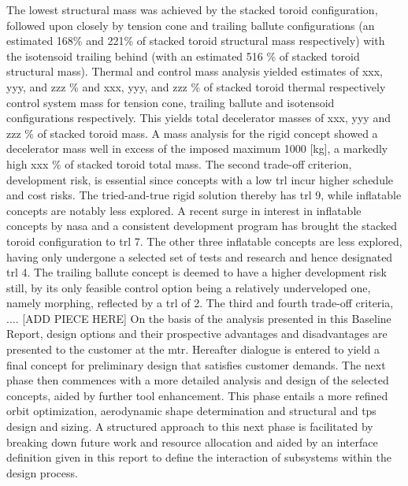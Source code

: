 The lowest structural mass was achieved by the stacked toroid configuration, followed upon closely by tension cone and trailing ballute configurations (an estimated 168\% and 221\% of stacked toroid structural mass respectively) with the isotensoid trailing behind (with an estimated 516 \% of stacked toroid structural mass). Thermal and control mass analysis yielded estimates of xxx, yyy, and zzz \% and xxx, yyy, and zzz \% of stacked toroid thermal respectively control system mass for tension cone, trailing ballute and isotensoid configurations respectively. This yields total decelerator masses of xxx, yyy and zzz \% of stacked toroid mass. A mass analysis for the rigid concept showed a decelerator mass well in excess of the imposed maximum 1000 [kg], a markedly high xxx \% of stacked toroid total mass.
\newline
\newline
The second trade-off criterion, development risk, is essential since concepts with a low \acrfull{trl} incur higher schedule and cost risks. The tried-and-true rigid solution thereby has \gls{trl} 9, while inflatable concepts are notably less explored. A recent surge in interest in inflatable concepts by \gls{nasa} and a consistent development program has brought the stacked toroid configuration to \gls{trl} 7. The other three inflatable concepts are less explored, having only undergone a selected set of tests and research and hence designated \gls{trl} 4. The trailing ballute concept is deemed to have a higher development risk still, by its only feasible control option being a relatively underveloped one, namely morphing, reflected by a \gls{trl} of 2.
\newline
\newline
The third and fourth trade-off criteria, .... [ADD PIECE HERE]
\newline
\newline
On the basis of the analysis presented in this Baseline Report, design options and their prospective advantages and disadvantages are presented to the customer at the \gls{mtr}. Hereafter dialogue is entered to yield a final concept for preliminary design that satisfies customer demands. The next phase then commences with a more detailed analysis and design of the selected concepts, aided by further tool enhancement. This phase entails a more refined orbit optimization, aerodynamic shape determination and structural and \gls{tps} design and sizing. A structured approach to this next phase is facilitated by breaking down future work and resource allocation and aided by an interface definition given in this report to define the interaction of subsystems within the design process.